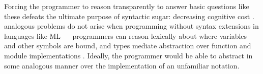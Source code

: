 \documentclass[acmsmall]{acmart}
\begin{document}
Forcing the programmer to reason transparently to answer basic questions like these defeats the ultimate purpose of syntactic sugar: decreasing cognitive cost \cite{Green89}. analogous problems do not arise when programming without syntax extensions in languages like ML --- programmers can reason lexically about where variables and other symbols are bound, and types mediate abstraction over function and module implementations \cite{B304}. Ideally, the programmer would be able to abstract in some analogous manner over the implementation of an unfamiliar notation. %
\end{document}
